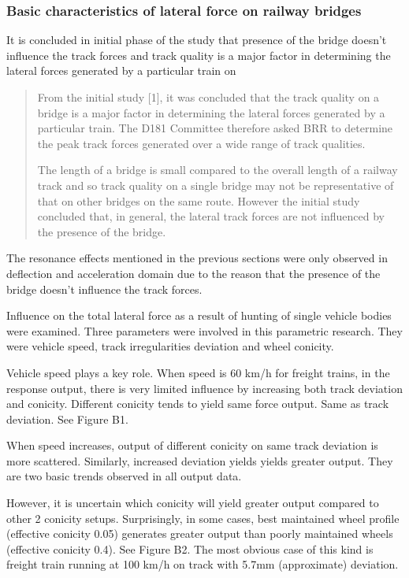 \subsubsection{Basic characteristics of lateral force on railway bridges}
It is concluded in initial phase of the study that presence of the bridge doesn't influence the track forces and track quality is a major factor in determining the lateral forces generated by a particular train on \cite[Page 7, Secondary Phase]{d181dt329}



\begin{quote}
    From the initial study [1], it was concluded that the track quality on a bridge is a major factor in determining the lateral forces generated by a particular train. The D181 Committee therefore asked BRR to determine the peak track forces generated over a wide range of track qualities.

    The length of a bridge is small compared to the overall length of a railway track and so track quality on a single bridge may not be representative of that on other bridges on the same route. However the initial study concluded that, in general, the lateral track forces are not influenced by the presence of the bridge.
\end{quote}

The resonance effects mentioned in the previous sections were only observed in deflection and acceleration domain due to the reason that the presence of the bridge doesn't influence the track forces. 


Influence on the total lateral force as a result of hunting of single vehicle bodies were examined. Three parameters were involved in this parametric research. They were vehicle speed, track irregularities deviation and wheel conicity.

Vehicle speed plays a key role. When speed is 60 km/h for freight trains, in the response output, there is very limited influence by increasing both track deviation and conicity. Different conicity tends to yield same force output. Same as track deviation. See Figure B1.

When speed increases, output of different conicity on same track deviation is more scattered. Similarly, increased deviation yields yields greater output. They are two basic trends observed in all output data.

However, it is uncertain which conicity will yield greater output compared to other 2 conicity setups. Surprisingly, in some cases, best maintained wheel profile (effective conicity 0.05) generates greater output than poorly maintained wheels (effective conicity 0.4). See Figure B2. The most obvious case of this kind is freight train running at 100 km/h on track with 5.7mm (approximate) deviation.

